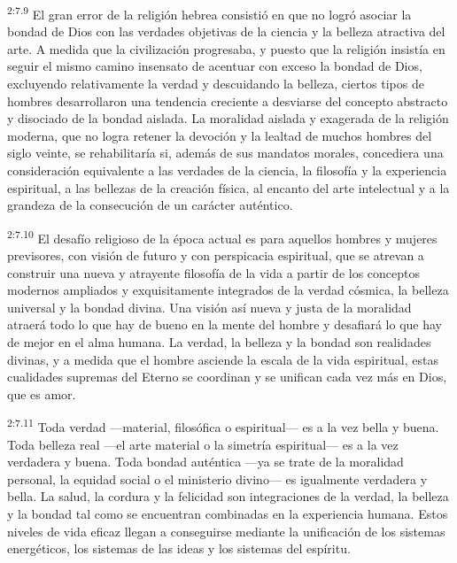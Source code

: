 \par
\textsuperscript{2:7.9} El gran error de la religión hebrea consistió en que no logró asociar la bondad de Dios con las verdades objetivas de la ciencia y la belleza atractiva del arte. A medida que la civilización progresaba, y puesto que la religión insistía en seguir el mismo camino insensato de acentuar con exceso la bondad de Dios, excluyendo relativamente la verdad y descuidando la belleza, ciertos tipos de hombres desarrollaron una tendencia creciente a desviarse del concepto abstracto y disociado de la bondad aislada. La moralidad aislada y exagerada de la religión moderna, que no logra retener la devoción y la lealtad de muchos hombres del siglo veinte, se rehabilitaría si, además de sus mandatos morales, concediera una consideración equivalente a las verdades de la ciencia, la filosofía y la experiencia espiritual, a las bellezas de la creación física, al encanto del arte intelectual y a la grandeza de la consecución de un carácter auténtico.

\par
\textsuperscript{2:7.10} El desafío religioso de la época actual es para aquellos hombres y mujeres previsores, con visión de futuro y con perspicacia espiritual, que se atrevan a construir una nueva y atrayente filosofía de la vida a partir de los conceptos modernos ampliados y exquisitamente integrados de la verdad cósmica, la belleza universal y la bondad divina. Una visión así nueva y justa de la moralidad atraerá todo lo que hay de bueno en la mente del hombre y desafiará lo que hay de mejor en el alma humana. La verdad, la belleza y la bondad son realidades divinas, y a medida que el hombre asciende la escala de la vida espiritual, estas cualidades supremas del Eterno se coordinan y se unifican cada vez más en Dios, que es amor.

\par
\textsuperscript{2:7.11} Toda verdad ---material, filosófica o espiritual--- es a la vez bella y buena. Toda belleza real ---el arte material o la simetría espiritual--- es a la vez verdadera y buena. Toda bondad auténtica ---ya se trate de la moralidad personal, la equidad social o el ministerio divino--- es igualmente verdadera y bella. La salud, la cordura y la felicidad son integraciones de la verdad, la belleza y la bondad tal como se encuentran combinadas en la experiencia humana. Estos niveles de vida eficaz llegan a conseguirse mediante la unificación de los sistemas energéticos, los sistemas de las ideas y los sistemas del espíritu.

